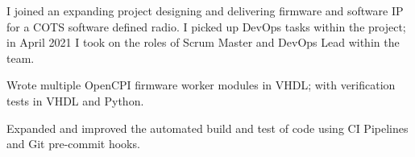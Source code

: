 I joined an expanding project designing and delivering firmware and software IP for a COTS software defined radio. I picked up DevOps tasks within the project; in April 2021 I took on the roles of Scrum Master and DevOps Lead within the team.
\vspace{0.25em}
\begin{tightemize}
    \item Wrote multiple OpenCPI firmware worker modules in VHDL; with verification tests in VHDL and Python.
    \item Expanded and improved the automated build and test of code using CI Pipelines and Git pre-commit hooks.
\end{tightemize}
\sectionsep{}
\vfill{}